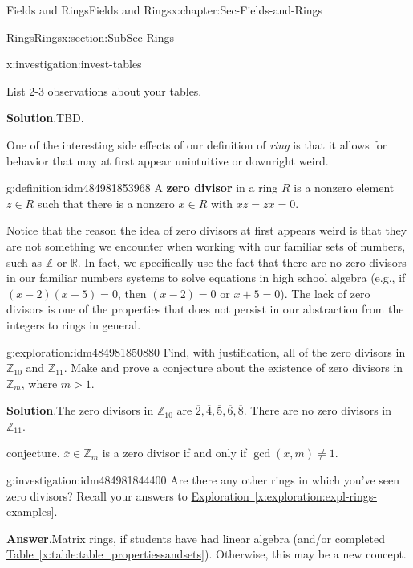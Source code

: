 \documentclass[oneside,10pt,]{book}
\newcommand{\blocktitlefont}{\relax}
\newcommand{\xreffont}{\relax}
\newcommand{\terminology}[1]{\textbf{#1}}
\numberwithin{equation}{section}
\def\Z{{\mathbb Z}}
\def\R{{\mathbb R}}
\begin{document}
\begin{chapterptx}{Fields and Rings}{}{Fields and Rings}{}{}{x:chapter:Sec-Fields-and-Rings}
\begin{sectionptx}{Rings}{}{Rings}{}{}{x:section:SubSec-Rings}
\begin{investigation}{}{x:investigation:invest-tables}
\begin{enumerate}
\end{enumerate}
List 2-3 observations about your tables.%
\par\smallskip%
\noindent\textbf{\blocktitlefont Solution}.\hypertarget{g:solution:idm484981855184}{}\quad{}TBD.%
\end{investigation}
One of the interesting side effects of our definition of \emph{ring} is that it allows for behavior that may at first appear unintuitive or downright weird.%
\begin{definition}{}{g:definition:idm484981853968}%
%
A \terminology{zero divisor} in a ring \(R\) is a nonzero element \(z\in R\) such that there is a nonzero \(x\in R\) with \(xz = zx = 0\).%
\end{definition}
Notice that the reason the idea of zero divisors at first appears weird is that they are not something we encounter when working with our familiar sets of numbers, such as \(\Z\) or \(\R\). In fact, we specifically use the fact that there are no zero divisors in our familiar numbers systems to solve equations in high school algebra (e.g., if \((x-2)(x+5)=0\), then \((x-2)=0\) or \(x+5=0\)). The lack of zero divisors is one of the properties that does not persist in our abstraction from the integers to rings in general.%
\begin{exploration}{}{g:exploration:idm484981850880}%
Find, with justification, all of the zero divisors in \(\Z_{10}\) and \(\Z_{11}\). Make and prove a conjecture about the existence of zero divisors in \(\Z_m\), where \(m > 1\).%
\par\smallskip%
\noindent\textbf{\blocktitlefont Solution}.\hypertarget{g:solution:idm484981845728}{}\quad{}The zero divisors in \(\Z_{10}\) are \(\overline{2}, \overline{4}, \overline{5}, \overline{6},\overline{8}\). There are no zero divisors in \(\Z_{11}\).%
\par
conjecture. \(\overline{x}\in \Z_m\) is a zero divisor if and only if \(\gcd(x,m) \ne 1\).%
\end{exploration}
\begin{investigation}{}{g:investigation:idm484981844400}%
Are there any other rings in which you've seen zero divisors? Recall your answers to \hyperref[x:exploration:expl-rings-examples]{Exploration~{\xreffont\ref{x:exploration:expl-rings-examples}}}.%
\par\smallskip%
\noindent\textbf{\blocktitlefont Answer}.\hypertarget{g:answer:idm484981841296}{}\quad{}Matrix rings, if students have had linear algebra (and\slash{}or completed \hyperref[x:table:table_propertiessandsets]{Table~{\xreffont\ref{x:table:table_propertiessandsets}}}). Otherwise, this may be a new concept.%

\end{investigation}
\end{sectionptx}
\end{chapterptx}
\end{document}
